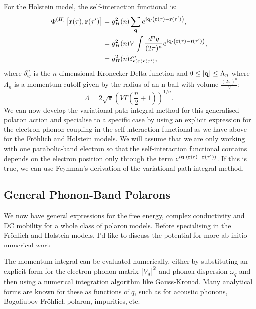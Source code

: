 For the Holstein model, the self-interaction functional is:
\begin{equation}
    \begin{aligned}
        \Phi^{(H)}\left[\vb{r}(\tau), \vb{r}(\tau')\right] &= g_H^2(n) \sum_{\vb{q}} e^{i \vb{q} \cdot \left(\vb{r}(\tau) - \vb{r}(\tau') \right)} ,\\
        &= g_{H}^2(n) V \int \frac{d^n q}{(2\pi)^n} e^{i\vb{q}\cdot\left(\vb{r}(\tau) - \vb{r}(\tau')\right)}, \\
        &= g_H^2(n) \delta^n_{\vb{r}(\tau)\vb{r}(\tau')} ,
    \end{aligned}
\end{equation}
where $\delta^n_{ij}$ is the $n$-dimensional Kronecker Delta function and $0 \leq \abs{\vb{q}} \leq \Lambda_n$ where $\Lambda_n$ is a momentum cutoff given by the radius of an n-ball with volume $\frac{(2\pi)^n}{V}$:
\begin{equation}
    \Lambda = 2\sqrt{\pi} \left(V \Gamma\left(\frac{n}{2} + 1\right)\right)^{1/n}.
\end{equation}
We can now develop the variational path integral method for this generalised polaron action and specialise to a specific case by using an explicit expression for the electron-phonon coupling in the self-interaction functional as we have above for the Fr\"ohlich and Holstein models. We will assume that we are only working with one parabolic-band electron so that the self-interaction functional contains depends on the electron position only through the term $e^{i \vb{q} \cdot (\vb{r}(\tau) - \vb{r}(\tau'))}$. If this is true, we can use Feynman's derivation of the variational path integral method.

\subsection{General Phonon-Band Polarons}

We now have general expressions for the free energy, complex conductivity and DC mobility for a whole class of polaron models. Before specialising in the Fr\"ohlich and Holstein models, I'd like to discuss the potential for more ab initio numerical work. 

The momentum integral can be evaluated numerically, either by substituting an explicit form for the electron-phonon matrix $\abs{V_q}^2$ and phonon dispersion $\omega_q$ and then using a numerical integration algorithm like Gauss-Kronod. Many analytical forms are known for these as functions of $q$, such as for acoustic phonons, Bogoliubov-Fröhlich polaron, impurities, etc.

